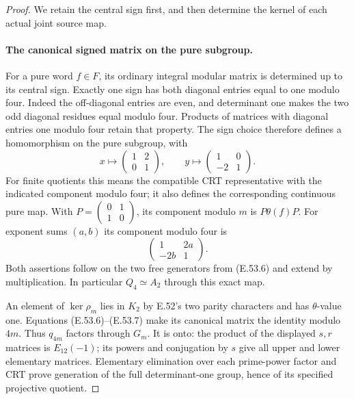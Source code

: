 \begin{proof}
We retain the central sign first, and then determine
the kernel of each actual joint source map.

\paragraph{The canonical signed matrix on the pure subgroup.}
For a pure word $f\in F$, its ordinary integral modular
matrix is determined up to its central sign. Exactly
one sign has both diagonal entries equal to one modulo
four. Indeed the off-diagonal entries are even, and
determinant one makes the two odd diagonal residues
equal modulo four. Products of matrices with diagonal
entries one modulo four retain that property.
The sign choice therefore defines a homomorphism on
the pure subgroup, with
\[
 x\longmapsto\begin{pmatrix}1&2\\0&1\end{pmatrix},\qquad
 y\longmapsto\begin{pmatrix}1&0\\-2&1\end{pmatrix}.
 \tag{E.53.6}
\]
For finite quotients this means the compatible CRT
representative with the indicated component modulo four;
it also defines the corresponding continuous pure map.
With $P=\left(\begin{smallmatrix}0&1\\1&0\end{smallmatrix}\right)$,
its component modulo $m$ is $P\theta(f)P$.
For exponent sums $(a,b)$ its component modulo four is
\[
                   \begin{pmatrix}1&2a\\-2b&1\end{pmatrix}.
 \tag{E.53.7}
\]
Both assertions follow on the two free generators
from \textup{(E.53.6)} and extend by multiplication.
In particular $Q_4\simeq A_2$ through this exact map.

An element of $\ker\rho_m$ lies in $K_2$ by E.52's
two parity characters and has $\theta$-value one.
Equations \textup{(E.53.6)--(E.53.7)} make its
canonical matrix the identity modulo $4m$.
Thus $q_{4m}$ factors through $G_m$.
It is onto: the product of the displayed $s,r$ matrices
is $E_{12}(-1)$; its powers and conjugation by $s$
give all upper and lower elementary matrices.
Elementary elimination over each prime-power factor
and CRT prove generation of the full determinant-one
group, hence of its specified projective quotient.


\end{proof}
